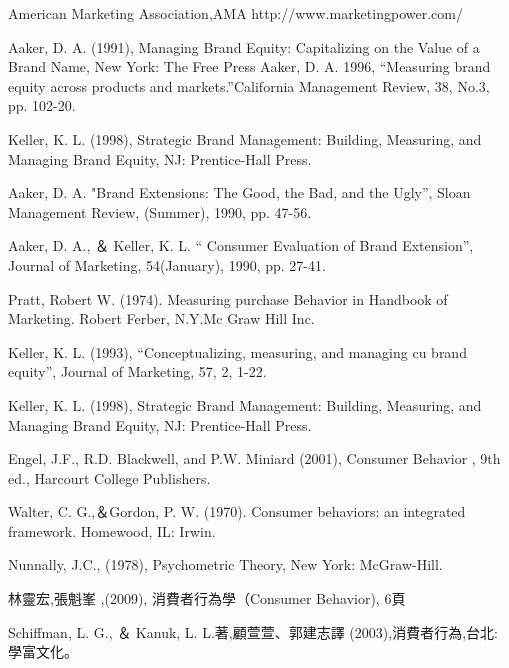 \documentclass[a4paper,12pt]{report}
\begin{document}
\begin{thebibliography}{1}


American Marketing Association,AMA http://www.marketingpower.com/

Aaker, D. A. (1991), Managing Brand Equity: Capitalizing on the Value of a Brand Name, New
York: The Free Press
Aaker, D. A. 1996, “Measuring brand equity across products and markets.”California Management Review, 38, No.3, pp. 102-20.

Keller, K. L. (1998), Strategic Brand Management: Building, Measuring, and Managing
Brand Equity, NJ: Prentice-Hall Press.

Aaker, D. A. "Brand Extensions: The Good, the Bad, and the Ugly”, Sloan 
Management Review, (Summer), 1990, pp. 47-56. 

Aaker, D. A.,  ＆ Keller, K. L. “
Consumer Evaluation of Brand Extension”, 
Journal of Marketing, 54(January), 1990, pp. 27-41.

Pratt, Robert W. (1974). Measuring purchase Behavior in Handbook of Marketing. Robert Ferber, N.Y.Mc Graw Hill Inc.

Keller, K. L. (1993), “Conceptualizing, measuring, and managing cu
brand equity”, Journal of Marketing, 57, 2, 1-22. 

Keller, K. L. (1998), Strategic Brand Management: Building, Measuring, and Managing
Brand Equity, NJ: Prentice-Hall Press.

Engel, J.F., R.D. Blackwell, and P.W. Miniard (2001), Consumer Behavior , 9th
ed., Harcourt College Publishers.

Walter, C. G.,＆Gordon, P. W. (1970). Consumer behaviors: an integrated framework. Homewood, IL: Irwin.



Nunnally, J.C., (1978), Psychometric Theory, New York: McGraw-Hill. 

林靈宏,張魁峯 ,(2009), 消費者行為學（Consumer Behavior), 6頁

Schiffman, L. G.,  ＆ Kanuk, L. L.著,顧萱萱、郭建志譯 (2003),消費者行為,台北: 學富文化。
\end{thebibliography}
\clearpage
\end{document}
